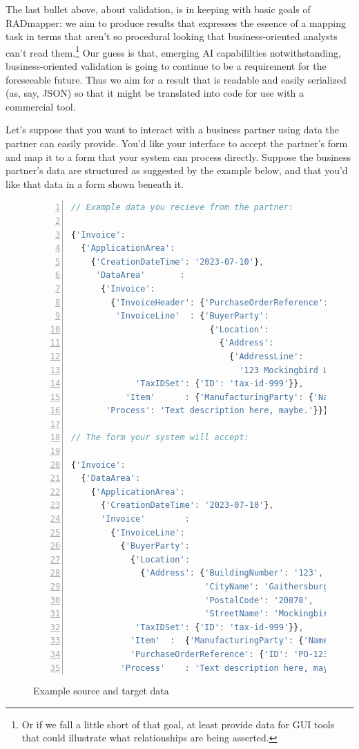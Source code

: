 \documentclass[10pt,letterpaper]{article} %
\begin{document}
The last bullet above, about validation, is in keeping with basic goals of RADmapper: we aim to produce results that expresses the essence of a mapping task in terms that aren't so procedural looking that business-oriented analysts can't read them.\footnote{Or if we fall a little short of that goal, at least provide data for GUI tools that could illustrate what relationships are being asserted.}
Our guess is that, emerging AI capabililties notwithstanding, business-oriented validation is going to continue to be a requirement for the foreseeable future.
Thus we aim for a result that is readable and easily serialized (as, say, JSON) so that it might be translated into code for use with a commercial tool.

Let's suppose that you want to interact with a business partner using data the partner can easily provide.
You'd like your interface to accept the partner's form and map it to a form that your system can process directly.
Suppose the business partner's data are structured as suggested by the example below, and that you'd like that data in a form shown beneath it.

\begin{figure}[H]
  \caption{Example source and target data}
  \label{fig:data-for-end-to-end}
\begin{lstlisting}[language=JavaScript,numberstyle=\scriptsize,basicstyle=\ttfamily\scriptsize,numbers=left,stepnumber=1,breaklines=true]
// Example data you recieve from the partner:

{'Invoice':
  {'ApplicationArea':
    {'CreationDateTime': '2023-07-10'},
     'DataArea'       :
      {'Invoice':
        {'InvoiceHeader': {'PurchaseOrderReference': {'ID': 'PO-1234'}},
         'InvoiceLine'  : {'BuyerParty':
                            {'Location':
                              {'Address':
                                {'AddressLine':
                                  '123 Mockingbird Lane, Gaithersburg MD, 20878'}},
             'TaxIDSet': {'ID': 'tax-id-999'}},
           'Item'      : {'ManufacturingParty': {'Name': 'Acme Widget'}}}},
       'Process': 'Text description here, maybe.'}}}

// The form your system will accept:

{'Invoice':
  {'DataArea':
    {'ApplicationArea':
      {'CreationDateTime': '2023-07-10'},
      'Invoice'        :
        {'InvoiceLine':
          {'BuyerParty':
            {'Location':
              {'Address': {'BuildingNumber': '123',
                           'CityName': 'Gaithersburg',
                           'PostalCode': '20878',
                           'StreetName': 'Mockingbird Lane'}},
             'TaxIDSet': {'ID': 'tax-id-999'}},
            'Item'  :  {'ManufacturingParty': {'Name': 'Acme Widget'}},
            'PurchaseOrderReference': {'ID': 'PO-1234'}},
          'Process'    : 'Text description here, maybe.'}}}}
\end{lstlisting}
\end{figure}
\end{document}
